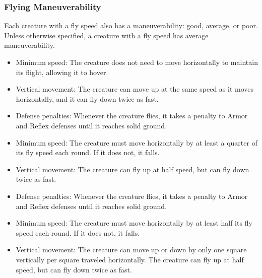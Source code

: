         \subsubsection{Flying Maneuverability}\label{Flying Maneuverability}
        Each creature with a fly speed also has a maneuverability: good, average, or poor.
        Unless otherwise specified, a creature with a fly speed has average maneuverability.

            \begin{itemize}
                \item Minimum speed: The creature does not need to move horizontally to maintain its flight, allowing it to hover.
                \item Vertical movement: The creature can move up at the same speed as it moves horizontally, and it can fly down twice as fast.
            \end{itemize}

            \begin{itemize}
                \item Defense penalties: Whenever the creature flies, it takes a  penalty to Armor and Reflex defenses until it reaches solid ground.
                \item Minimum speed: The creature must move horizontally by at least a quarter of its fly speed each round. If it does not, it falls.
                \item Vertical movement: The creature can fly up at half speed, but can fly down twice as fast.
            \end{itemize}

            \begin{itemize}
                \item Defense penalties: Whenever the creature flies, it takes a  penalty to Armor and Reflex defenses until it reaches solid ground.
                \item Minimum speed: The creature must move horizontally by at least half its fly speed each round. If it does not, it falls.
                \item Vertical movement: The creature can move up or down by only one square vertically per square traveled horizontally.
                    The creature can fly up at half speed, but can fly down twice as fast.
            \end{itemize}

